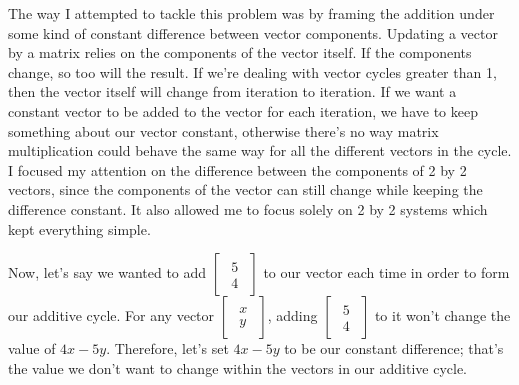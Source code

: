 \documentclass[a4paper, 12pt, reqno]{amsart}
\begin{document}
			The way I attempted to tackle this problem was by framing the addition under some kind of constant difference
			between vector components. Updating a vector by a matrix relies on the components of the vector itself. If the
			components change, so too will the result. If we're dealing with vector cycles greater than 1, then the vector
			itself will change from iteration to iteration. If we want a constant vector to be added to the vector for each
			iteration, we have to keep something about our vector constant, otherwise there's no way matrix multiplication
			could behave the same way for all the different vectors in the cycle. I focused my attention on the difference
			between the components of 2 by 2 vectors, since the components of the vector can still change while keeping the
			difference constant. It also allowed me to focus solely on 2 by 2 systems which kept everything simple.
			
			Now, let's say we wanted to add 
			$
				\begin{bmatrix}
					\begin{smallmatrix}
						5 \\
						4
					\end{smallmatrix}
				\end{bmatrix}
			$
			to our vector each time in order to form our additive cycle. For any vector 
			$
				\begin{bmatrix}
					\begin{smallmatrix}
						x \\
						y
					\end{smallmatrix}
				\end{bmatrix}
			$,
			adding
			$
				\begin{bmatrix}
					\begin{smallmatrix}
						5 \\
						4
					\end{smallmatrix}
				\end{bmatrix}
			$
			to it won't change the value of $4x - 5y$. Therefore, let's set $4x - 5y$ to be our constant difference;
			that's the value we don't want to change within the vectors in our additive cycle.
			
\end{document}
